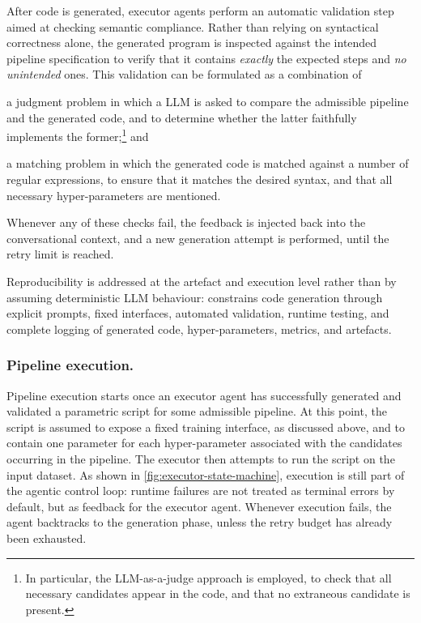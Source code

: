 \documentclass[runningheads]{llncs}
\begin{document}
After code is generated,
executor agents perform an automatic validation step aimed at checking semantic compliance.
%
Rather than relying on syntactical correctness alone,
the generated program is inspected against the intended pipeline specification
to verify that it contains \emph{exactly} the expected steps and \emph{no unintended} ones.
%
This validation can be formulated as a combination of
\begin{inlinelist}
  \item a judgment problem in which a \ac{LLM} is asked to compare
  the admissible pipeline and the generated code,
  and to determine whether the latter faithfully implements the former;\footnote{In particular, 
  	the \ac{LLM}-as-a-judge approach is employed, 
	to check that all necessary candidates appear in the code, 
	and that no extraneous candidate is present.}
  and
  \item a matching problem in which the generated code is matched against a number of regular expressions,
  to ensure that it matches the desired syntax,
  and that all necessary hyper-parameters are mentioned.
\end{inlinelist}
%
Whenever any of these checks fail,
the feedback is injected back into the conversational context,
and a new generation attempt is performed,
until the retry limit is reached.

Reproducibility is addressed at the artefact and execution level rather than by assuming deterministic \ac{LLM} behaviour: 
\ourapproach{} constrains code generation through explicit prompts, fixed interfaces, automated validation, runtime testing, and complete logging of generated code, hyper-parameters, metrics, and artefacts.


\subsubsection{Pipeline execution.}

Pipeline execution starts once an executor agent has successfully generated
and validated a parametric script for some admissible pipeline.
%
At this point,
the script is assumed to expose a fixed training interface,
as discussed above,
and to contain one parameter for each hyper-parameter associated with the candidates occurring in the pipeline.
%
The executor then attempts to run the script on the input dataset.
%
As shown in \cref{fig:executor-state-machine},
execution is still part of the agentic control loop:
runtime failures are not treated as terminal errors by default,
but as feedback for the executor agent.
%
Whenever execution fails,
the agent backtracks to the generation phase,
unless the retry budget has already been exhausted.
%
\end{document}
